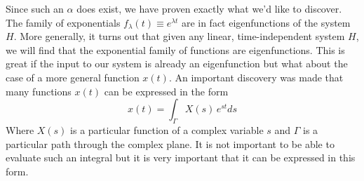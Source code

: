 \documentclass{article}
\begin{document}
    Since such an $\alpha$ does exist, we have proven exactly what we'd like to discover. The family of exponentials $f_\lambda(t) \equiv e^{\lambda t}$ are in fact eigenfunctions of the system $H$. More generally, it turns out that given any linear, time-independent system $H$, we will find that the exponential family of functions are eigenfunctions.
    This is great if the input to our system is already an eigenfunction but what about the case of a more general function $x(t)$. An important discovery was made that many functions $x(t)$ can be expressed in the form $$x(t) = \int_\Gamma X(s) \, e^{st} ds$$ Where $X(s)$ is a particular function of a complex variable $s$ and $\Gamma$ is a particular path through the complex plane. It is not important to be able to evaluate such an integral but it is very important that it can be expressed in this form. 
\end{document}
